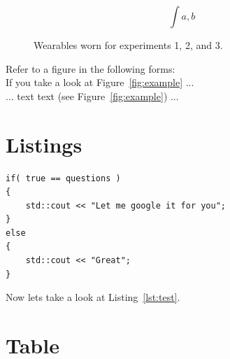 $$\int{a,b}$$


\begin{figure}[h]
    \centering
    \caption{Wearables worn for experiments 1, 2, and 3.}\label{fig:figure2}
\end{figure}

Refer to a figure in the following forms:\\
If you take a look at Figure~\ref{fig:example} ...\\
... text text (see Figure~\ref{fig:example}) ...

\section{Listings}
\begin{lstlisting}[caption=A bit of source code., label=lst:test]
if( true == questions )
{
    std::cout << "Let me google it for you";
}
else
{
    std::cout << "Great";
}
\end{lstlisting}

Now lets take a look at Listing~\ref{lst:test}.


\section{Table}

